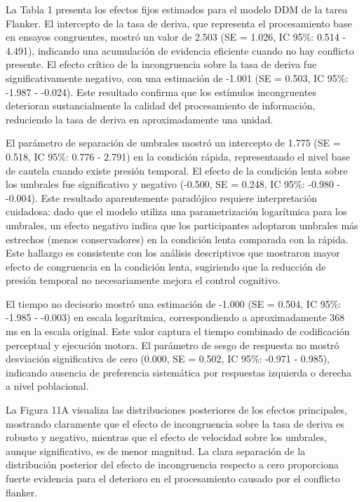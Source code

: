\documentclass[
  spanish,
  10pt,
]{article}
\begin{document}
La Tabla 1 presenta los efectos fijos estimados para el modelo DDM de la
tarea Flanker. El intercepto de la tasa de deriva, que representa el
procesamiento base en ensayos congruentes, mostró un valor de 2.503 (SE
= 1.026, IC 95\%: 0.514 - 4.491), indicando una acumulación de evidencia
eficiente cuando no hay conflicto presente. El efecto crítico de la
incongruencia sobre la tasa de deriva fue significativamente negativo,
con una estimación de -1.001 (SE = 0.503, IC 95\%: -1.987 - -0.024).
Este resultado confirma que los estímulos incongruentes deterioran
sustancialmente la calidad del procesamiento de información, reduciendo
la tasa de deriva en aproximadamente una unidad.

El parámetro de separación de umbrales mostró un intercepto de 1.775 (SE
= 0.518, IC 95\%: 0.776 - 2.791) en la condición rápida, representando
el nivel base de cautela cuando existe presión temporal. El efecto de la
condición lenta sobre los umbrales fue significativo y negativo (-0.500,
SE = 0.248, IC 95\%: -0.980 - -0.004). Este resultado aparentemente
paradójico requiere interpretación cuidadosa: dado que el modelo utiliza
una parametrización logarítmica para los umbrales, un efecto negativo
indica que los participantes adoptaron umbrales más estrechos (menos
conservadores) en la condición lenta comparada con la rápida. Este
hallazgo es consistente con los análisis descriptivos que mostraron
mayor efecto de congruencia en la condición lenta, sugiriendo que la
reducción de presión temporal no necesariamente mejora el control
cognitivo.

El tiempo no decisorio mostró una estimación de -1.000 (SE = 0.504, IC
95\%: -1.985 - -0.003) en escala logarítmica, correspondiendo a
aproximadamente 368 ms en la escala original. Este valor captura el
tiempo combinado de codificación perceptual y ejecución motora. El
parámetro de sesgo de respuesta no mostró desviación significativa de
cero (0.000, SE = 0.502, IC 95\%: -0.971 - 0.985), indicando ausencia de
preferencia sistemática por respuestas izquierda o derecha a nivel
poblacional.

La Figura 11A visualiza las distribuciones posteriores de los efectos
principales, mostrando claramente que el efecto de incongruencia sobre
la tasa de deriva es robusto y negativo, mientras que el efecto de
velocidad sobre los umbrales, aunque significativo, es de menor
magnitud. La clara separación de la distribución posterior del efecto de
incongruencia respecto a cero proporciona fuerte evidencia para el
deterioro en el procesamiento causado por el conflicto flanker.
\end{document}
